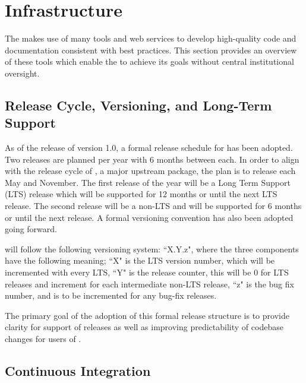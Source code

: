 \section{Infrastructure}
\label{sec:infrastructure}

The \sunpyproj makes use of many tools and web services to develop high-quality code and documentation consistent with best practices.
This section provides an overview of these tools which enable the \sunpyproj to achieve its goals without central institutional oversight.

\subsection{Release Cycle, Versioning, and Long-Term Support}
\label{sec:release}

As of the release of version 1.0, a formal release schedule for \sunpypkg has been adopted.
Two releases are planned per year with 6 months between each.
In order to align with the release cycle of \astropypkg, a major upstream package, the plan is to release each May and November.
The first release of the year will be a Long Term Support (LTS) release which will be supported for 12 months or until the next LTS release.
The second release will be a non-LTS and will be supported for 6 months or until the next release.
A formal versioning convention has also been adopted going forward.

\sunpypkg will follow the following versioning system: ``X.Y.z", where the three components have the following meaning;
``X" is the LTS version number, which will be incremented with every LTS,
``Y" is the release counter, this will be 0 for LTS releases and increment for each intermediate non-LTS release,
``z" is the bug fix number, and is to be incremented for any bug-fix releases.

The primary goal of the adoption of this formal release structure is to provide clarity for support of releases as well as improving predictability of codebase changes for users of \sunpypkg.

\subsection{Continuous Integration}
\label{sec:continuous-integration}

